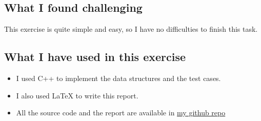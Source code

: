 \documentclass[a4paper,12pt]{report}
\begin{document}
\subsection{What I found challenging}
\begin{flushleft}
  This exercise is quite simple and easy, so I have no difficulties to finish this task.
\end{flushleft}
\subsection{What I have used in this exercise}
\begin{itemize}
  \item I used C++ to implement the data structures and the test cases.
  \item I also used \LaTeX{} to write this report.
  \item All the source code and the report are available in \href{https://github.com/yuran1811/hcmus-solutions/tree/main/dsa/Exercise1}{my github repo}
\end{itemize}
\end{document}
